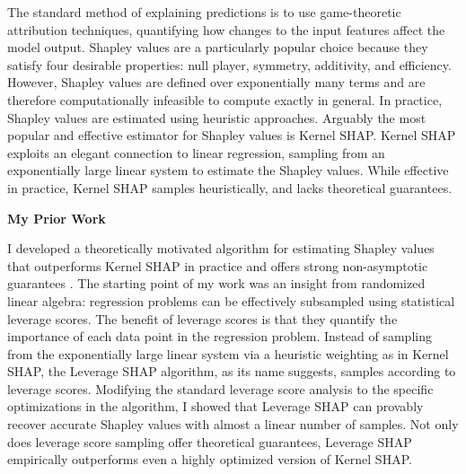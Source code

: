 \documentclass[11pt]{article}
\begin{document}
{The standard method of explaining predictions is to use game-theoretic attribution techniques, quantifying how changes to the input features affect the model output.
Shapley values are a particularly popular choice because they satisfy four desirable properties: null player, symmetry, additivity, and efficiency.
However, Shapley values are defined over exponentially many terms and are therefore computationally infeasible to compute exactly in general.
In practice, Shapley values are estimated using heuristic approaches.
Arguably the most popular and effective estimator for Shapley values is Kernel SHAP.
Kernel SHAP exploits an elegant connection to linear regression, sampling from an exponentially large linear system to estimate the Shapley values.
While effective in practice, Kernel SHAP samples heuristically, and lacks theoretical guarantees.

{ \large \textbf{My Prior Work}}

I developed a theoretically motivated algorithm for estimating Shapley values that outperforms Kernel SHAP in practice and offers strong non-asymptotic guarantees \cite{musco2024leverage}.
The starting point of my work was an insight from randomized linear algebra: regression problems can be effectively subsampled using statistical leverage scores.
The benefit of leverage scores is that they quantify the importance of each data point in the regression problem.
Instead of sampling from the exponentially large linear system via a heuristic weighting as in Kernel SHAP, the Leverage SHAP algorithm, as its name suggests, samples according to leverage scores.
Modifying the standard leverage score analysis to the specific optimizations in the algorithm, I showed that Leverage SHAP can provably recover accurate Shapley values with almost a linear number of samples.
Not only does leverage score sampling offer theoretical guarantees, Leverage SHAP empirically outperforms even a highly optimized version of Kernel SHAP.

}
\end{document}
